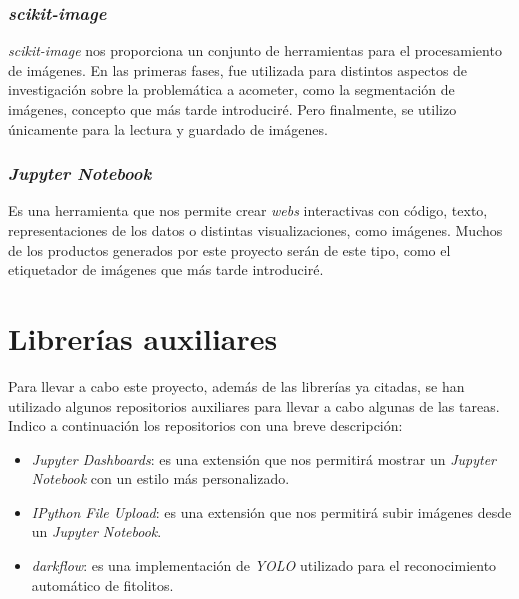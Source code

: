 \subsubsection{\textit{scikit-image}}

\textit{scikit-image} nos proporciona un conjunto de herramientas para el procesamiento de imágenes. En las primeras fases, fue utilizada para distintos aspectos de investigación sobre la problemática a acometer, como la segmentación de imágenes, concepto que más tarde introduciré. Pero finalmente, se utilizo únicamente para la lectura y guardado de imágenes.


\subsubsection{\textit{Jupyter Notebook}}

Es una herramienta que nos permite crear \textit{webs} interactivas con código, texto, representaciones de los datos o distintas visualizaciones, como imágenes. Muchos de los productos generados por este proyecto serán de este tipo, como el etiquetador de imágenes que más tarde introduciré.

\section{Librerías auxiliares}

Para llevar a cabo este proyecto, además de las librerías ya citadas, se han utilizado algunos repositorios auxiliares para llevar a cabo algunas de las tareas. Indico a continuación los repositorios con una breve descripción:

\begin{itemize}
	\item \textit{Jupyter Dashboards}: es una extensión que nos permitirá mostrar un \textit{Jupyter Notebook} con un estilo más personalizado.
	\item \textit{IPython File Upload}: es una extensión que nos permitirá subir imágenes desde un \textit{Jupyter Notebook}.
	\item \textit{darkflow}: es una implementación de \textit{YOLO} utilizado para el reconocimiento automático de fitolitos.
\end{itemize}

